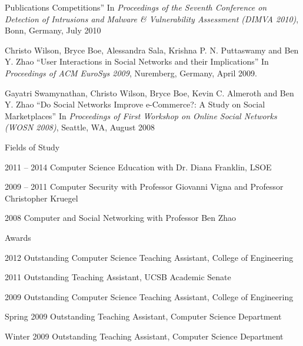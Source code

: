 \begin{vitae}
{\begin{vitaesection}{Publications}
    Competitions'' In \emph{Proceedings of the Seventh Conference on Detection
      of Intrusions and Malware \& Vulnerability Assessment (DIMVA 2010)},
    Bonn, Germany, July 2010
  \item Christo Wilson, Bryce Boe, Alessandra Sala, Krishna P. N. Puttaswamy
    and Ben Y. Zhao ``User Interactions in Social Networks and their
    Implications'' In \emph{Proceedings of ACM EuroSys 2009}, Nuremberg,
    Germany, April 2009.
  \item Gayatri Swamynathan, Christo Wilson, Bryce Boe, Kevin C. Almeroth and
    Ben Y. Zhao ``Do Social Networks Improve e-Commerce?: A Study on Social
    Marketplaces'' In \emph{Proceedings of First Workshop on Online Social
      Networks (WOSN 2008)}, Seattle, WA, August 2008
\end{vitaesection}

\begin{vitaesection}{Fields of Study}
\vspace{-0.1cm}
  \item [2011 -- 2014] Computer Science Education with Dr. Diana Franklin, LSOE
  \item [2009 -- 2011] Computer Security with Professor Giovanni Vigna and
    Professor Christopher Kruegel
  \item [2008] Computer and Social Networking with Professor Ben Zhao
\end{vitaesection}

\begin{vitaesection}{Awards}
\vspace{-0.1cm}
  \item [2012] Outstanding Computer Science Teaching Assistant, College of
    Engineering
  \item [2011] Outstanding Teaching Assistant, UCSB Academic Senate
  \item [2009] Outstanding Computer Science Teaching Assistant, College of
    Engineering
  \item [Spring 2009] Outstanding Teaching Assistant, Computer Science
    Department
  \item [Winter 2009] Outstanding Teaching Assistant, Computer Science
    Department
\end{vitaesection}

}
\end{vitae}
